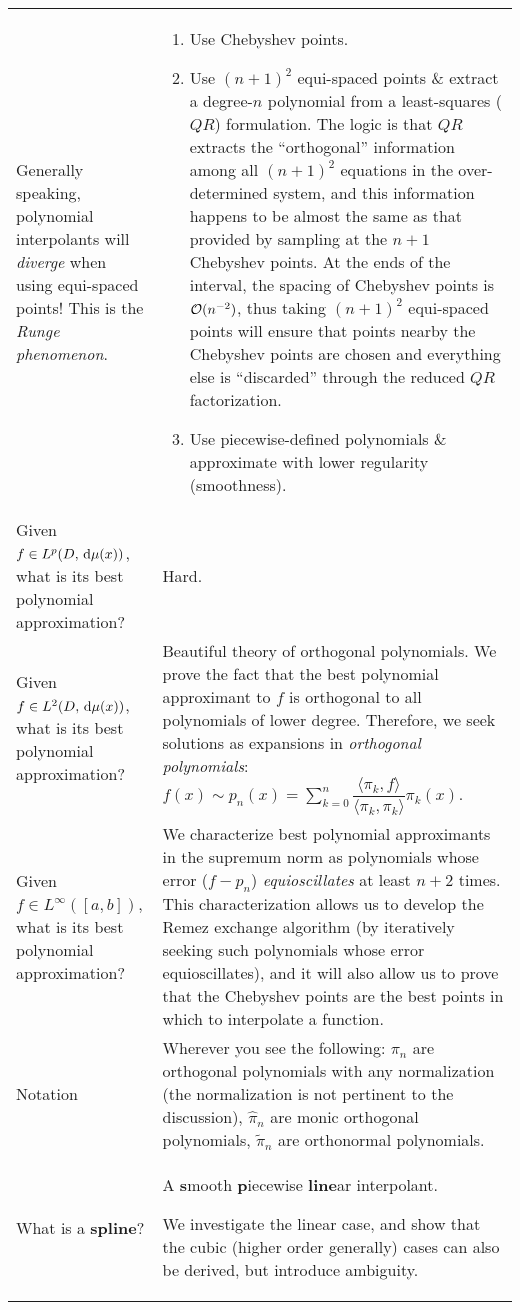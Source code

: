 \documentclass[11pt,letterpaper]{article}
\begin{document}
\begin{longtable}{p{}|p{}}
Generally speaking, polynomial interpolants will {\em diverge} when using equi-spaced points! This is the {\em Runge phenomenon}. & \vspace*{-.7cm}\begin{enumerate} \item Use Chebyshev points. \item Use $(n+1)^2$ equi-spaced points \& extract a degree-$n$ polynomial from a least-squares ($QR$) formulation. The logic is that $QR$ extracts the ``orthogonal'' information among all $(n+1)^2$ equations in the over-determined system, and this information happens to be almost the same as that provided by sampling at the $n+1$ Chebyshev points. At the ends of the interval, the spacing of Chebyshev points is $\mathcal{O}(n^{-2})$, thus taking $(n+1)^2$ equi-spaced points will ensure that points nearby the Chebyshev points are chosen and everything else is ``discarded'' through the reduced $QR$ factorization. \item Use piecewise-defined polynomials \& approximate with lower regularity (smoothness).\end{enumerate}\\

Given $f\in L^p(D,{\rm\,d}\mu(x))$, what is its best polynomial approximation? & Hard.\\

Given $f\in L^2(D,{\rm\,d}\mu(x))$, what is its best polynomial approximation? & Beautiful theory of orthogonal polynomials. We prove the fact that the best polynomial approximant to $f$ is orthogonal to all polynomials of lower degree. Therefore, we seek solutions as expansions in {\em orthogonal polynomials}: $\displaystyle f(x) \sim p_n(x) = \sum_{k=0}^n \dfrac{\langle \pi_k, f\rangle}{\langle \pi_k,\pi_k\rangle}\pi_k(x)$.\\

Given $f\in L^\infty([a,b])$, what is its best polynomial approximation? & We characterize best polynomial approximants in the supremum norm as polynomials whose error ($f-p_n$) {\em equioscillates} at least $n+2$ times. This characterization allows us to develop the Remez exchange algorithm (by iteratively seeking such polynomials whose error equioscillates), and it will also allow us to prove that the Chebyshev points are the best points in which to interpolate a function.\\

Notation & Wherever you see the following: $\pi_n$ are orthogonal polynomials with any normalization (the normalization is not pertinent to the discussion), $\hat{\pi}_n$ are monic orthogonal polynomials, $\tilde{\pi}_n$ are orthonormal polynomials.\\

What is a {\bf spline}? & A {\bf s}mooth {\bf p}iecewise {\bf line}ar interpolant.

We investigate the linear case, and show that the cubic (higher order generally) cases can also be derived, but introduce ambiguity.\\
\hline
\end{longtable}
\end{document}
